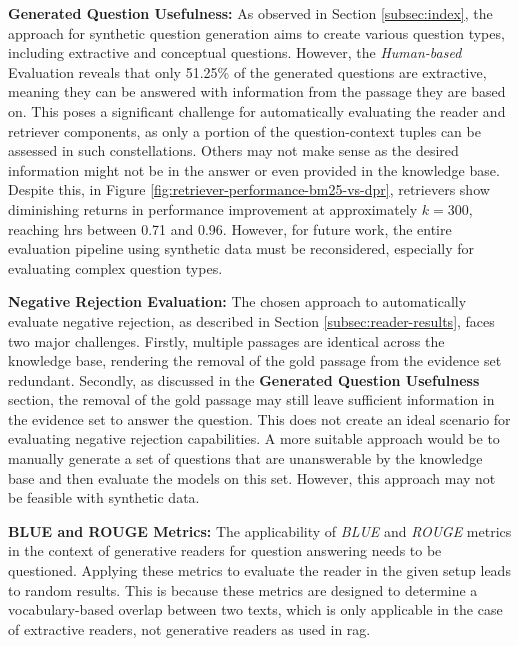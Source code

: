 \vspace{\baselineskip}
\noindent\textbf{Generated Question Usefulness:} As observed in Section \ref{subsec:index}, the approach for synthetic question generation aims to create various question types, including extractive and conceptual questions. However, the \textit{Human-based} Evaluation reveals that only 51.25\% of the generated questions are extractive, meaning they can be answered with information from the passage they are based on. This poses a significant challenge for automatically evaluating the reader and retriever components, as only a portion of the question-context tuples can be assessed in such constellations. Others may not make sense as the desired information might not be in the answer or even provided in the knowledge base. Despite this, in Figure \ref{fig:retriever-performance-bm25-vs-dpr}, retrievers show diminishing returns in performance improvement at approximately $k = 300$, reaching \gls{hr}s between 0.71 and 0.96. However, for future work, the entire evaluation pipeline using synthetic data must be reconsidered, especially for evaluating complex question types.

\vspace{\baselineskip}
\noindent\textbf{Negative Rejection Evaluation:} The chosen approach to automatically evaluate negative rejection, as described in Section \ref{subsec:reader-results}, faces two major challenges. Firstly, multiple passages are identical across the knowledge base, rendering the removal of the gold passage from the evidence set redundant. Secondly, as discussed in the \textbf{Generated Question Usefulness} section, the removal of the gold passage may still leave sufficient information in the evidence set to answer the question. This does not create an ideal scenario for evaluating negative rejection capabilities. A more suitable approach would be to manually generate a set of questions that are unanswerable by the knowledge base and then evaluate the models on this set. However, this approach may not be feasible with synthetic data.

\vspace{\baselineskip}
\noindent\textbf{BLUE and ROUGE Metrics:} The applicability of \textit{BLUE} and \textit{ROUGE} metrics in the context of generative readers for question answering needs to be questioned. Applying these metrics to evaluate the reader in the given setup leads to random results. This is because these metrics are designed to determine a vocabulary-based overlap between two texts, which is only applicable in the case of extractive readers, not generative readers as used in \gls{rag}.


